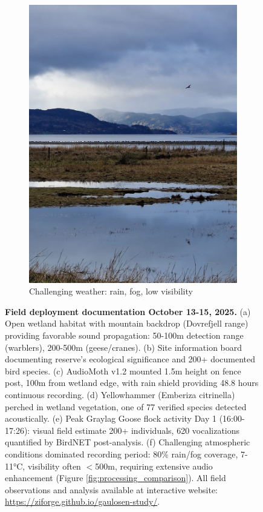 \documentclass[twocolumn]{article}
\begin{document}
\begin{figure}[h]
\begin{subfigure}{0.31\textwidth}
\includegraphics[width=\textwidth]{07_wetland_waterfowl_dramatic.jpg}
\caption{Challenging weather: rain, fog, low visibility}
\end{subfigure}

\caption{\textbf{Field deployment documentation October 13-15, 2025.} (a) Open wetland habitat with mountain backdrop (Dovrefjell range) providing favorable sound propagation: 50-100m detection range (warblers), 200-500m (geese/cranes). (b) Site information board documenting reserve's ecological significance and 200+ documented bird species. (c) AudioMoth v1.2 mounted 1.5m height on fence post, 100m from wetland edge, with rain shield providing 48.8 hours continuous recording. (d) Yellowhammer (Emberiza citrinella) perched in wetland vegetation, one of 77 verified species detected acoustically. (e) Peak Graylag Goose flock activity Day 1 (16:00-17:26): visual field estimate 200+ individuals, 620 vocalizations quantified by BirdNET post-analysis. (f) Challenging atmospheric conditions dominated recording period: 80\% rain/fog coverage, 7-11°C, visibility often $<$500m, requiring extensive audio enhancement (Figure \ref{fig:processing_comparison}). All field observations and analysis available at interactive website: \url{https://ziforge.github.io/gaulosen-study/}.}
\label{fig:field_deployment}
\end{figure}
\end{document}
